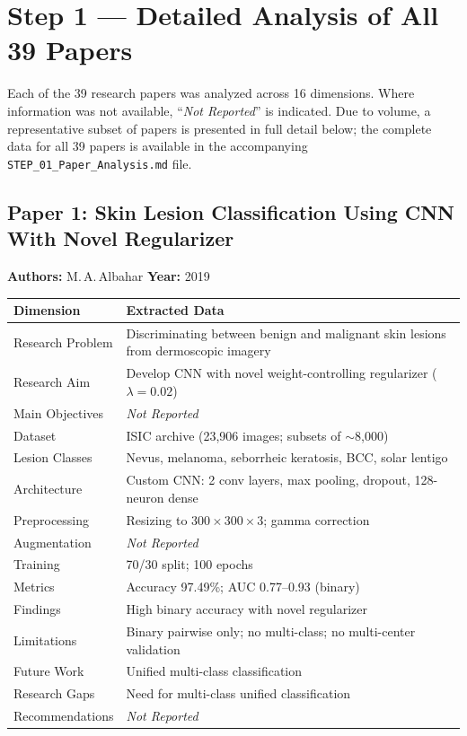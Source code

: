 \documentclass[11pt,a4paper]{article}
\newcommand{\NR}{\textit{Not Reported}}
\begin{document}
\tableofcontents
\newpage

\section{Step 1 --- Detailed Analysis of All 39 Papers}
\label{sec:step1}

Each of the 39 research papers was analyzed across 16 dimensions. Where information was not available, ``\NR'' is indicated. Due to volume, a representative subset of papers is presented in full detail below; the complete data for all 39 papers is available in the accompanying \texttt{STEP\_01\_Paper\_Analysis.md} file.

\subsection{Paper 1: Skin Lesion Classification Using CNN With Novel Regularizer}
\textbf{Authors:} M.\,A.\,Albahar \hfill \textbf{Year:} 2019

\begin{tabularx}{\textwidth}{@{}L{4.2cm}X@{}}
\toprule
\textbf{Dimension} & \textbf{Extracted Data} \\
\midrule
Research Problem & Discriminating between benign and malignant skin lesions from dermoscopic imagery \\
Research Aim & Develop CNN with novel weight-controlling regularizer ($\lambda=0.02$) \\
Main Objectives & \NR \\
Dataset & ISIC archive (23,906 images; subsets of $\sim$8,000) \\
Lesion Classes & Nevus, melanoma, seborrheic keratosis, BCC, solar lentigo \\
Architecture & Custom CNN: 2 conv layers, max pooling, dropout, 128-neuron dense \\
Preprocessing & Resizing to $300\times300\times3$; gamma correction \\
Augmentation & \NR \\
Training & 70/30 split; 100 epochs \\
Metrics & Accuracy 97.49\%; AUC 0.77--0.93 (binary) \\
Findings & High binary accuracy with novel regularizer \\
Limitations & Binary pairwise only; no multi-class; no multi-center validation \\
Future Work & Unified multi-class classification \\
Research Gaps & Need for multi-class unified classification \\
Recommendations & \NR \\
\bottomrule
\end{tabularx}
\end{document}
